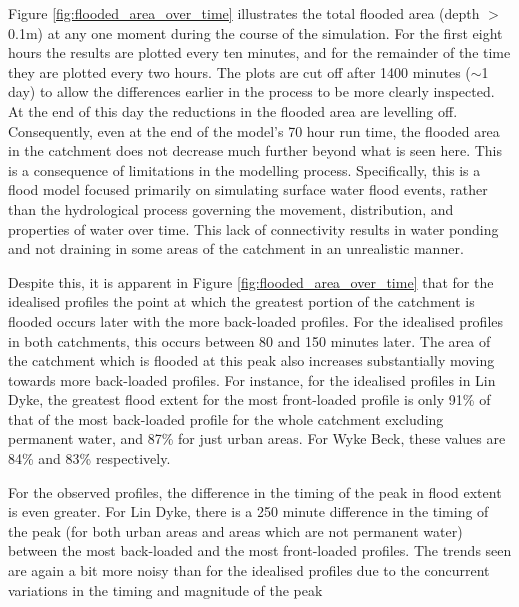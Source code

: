 \documentclass[APA,Times2COL]{WileyNJDv5}
\begin{document}
Figure \ref{fig:flooded_area_over_time} illustrates the total flooded area (depth $>$0.1m) at any one moment during the course of the simulation. For the first eight hours the results are plotted every ten minutes, and for the remainder of the time they are plotted every two hours. The plots are cut off after 1400 minutes ($\sim$1 day) to allow the differences earlier in the process to be more clearly inspected. At the end of this day the reductions in the flooded area are levelling off. Consequently, even at the end of the model's 70 hour run time, the flooded area in the catchment does not decrease much further beyond what is seen here. This is a consequence of limitations in the modelling process. Specifically, this is a flood model focused primarily on simulating surface water flood events, rather than the hydrological process governing the movement, distribution, and properties of water over time. This lack of connectivity results in water ponding and not draining in some areas of the catchment in an unrealistic manner.

Despite this, it is apparent in Figure \ref{fig:flooded_area_over_time} that for the idealised profiles the point at which the greatest portion of the catchment is flooded occurs later with the more back-loaded profiles. For the idealised profiles in both catchments, this occurs between 80 and 150 minutes later. The area of the catchment which is flooded at this peak also increases substantially moving towards more back-loaded profiles. For instance, for the idealised profiles in Lin Dyke, the greatest flood extent for the most front-loaded profile is only 91\% of that of the most back-loaded profile for the whole catchment excluding permanent water, and 87\% for just urban areas. For Wyke Beck, these values are 84\% and 83\% respectively. 

For the observed profiles, the difference in the timing of the peak in flood extent is even greater. For Lin Dyke, there is a 250 minute difference in the timing of the peak (for both urban areas and areas which are not permanent water) between the most back-loaded and the most front-loaded profiles. The trends seen are again a bit more noisy than for the idealised profiles due to the concurrent variations in the timing and magnitude of the peak 

\end{document}
